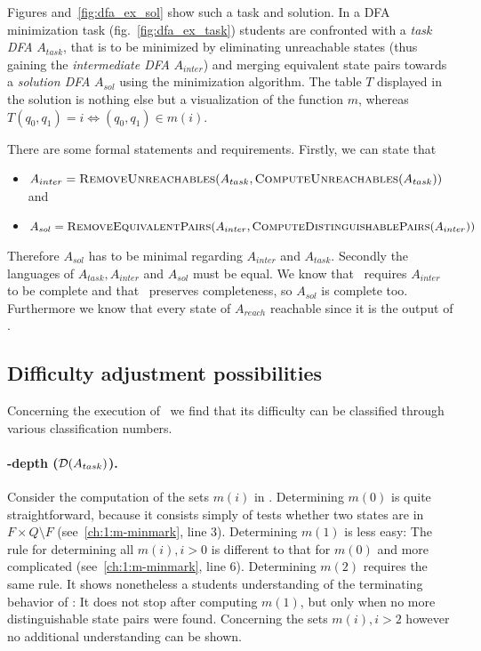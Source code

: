 \noindent Figures and~\ref{fig:dfa_ex_sol} show such a task and solution. In a DFA minimization task (fig.~\ref{fig:dfa_ex_task}) students are confronted with a \emph{task DFA} $A_{task}$, that is to be minimized by eliminating unreachable states (thus gaining the \emph{intermediate DFA} $A_{inter}$) and merging equivalent state pairs towards a \emph{solution DFA} $A_{sol}$ using the minimization algorithm. The table $T$ displayed in the solution is nothing else but a visualization of the function $m$, whereas $T(q_0, q_1) = i \Leftrightarrow (q_0, q_1) \in m(i)$. 

There are some formal statements and requirements. Firstly, we can state that
\begin{itemize}
	\item $A_{inter} = \textsc{RemoveUnreachables}(A_{task}, \textsc{ComputeUnreachables}(A_{task}))$ and
	\item $A_{sol} = \textsc{RemoveEquivalentPairs}(A_{inter}, \textsc{ComputeDistinguishablePairs}(A_{inter}))$
\end{itemize}
Therefore $A_{sol}$ has to be minimal regarding $A_{inter}$ and $A_{task}$. Secondly the languages of $A_{task}, A_{inter}$ and $A_{sol}$ must be equal. We know that \CompDist\ requires $A_{inter}$ to be complete and that \RemEq\ preserves completeness, so $A_{sol}$ is complete too. Furthermore we know that every state of $A_{reach}$ reachable since it is the output of \RemUnr.


\subsection{Difficulty adjustment possibilities}

Concerning the execution of \MinAlg\ we find that its difficulty can be classified through various classification numbers.

\paragraph*{\CompDist-depth ($\mathcal{D}(A_{task})$).}

Consider the computation of the sets $m(i)$ in \CompDist. Determining $m(0)$ is quite straightforward, because it consists simply of tests whether two states are in $F \times Q \setminus F$ (see~\ref{ch:1:m-minmark}, line 3). Determining $m(1)$ is less easy: The rule for determining all $m(i), i > 0$ is different to that for $m(0)$ and more complicated (see~\ref{ch:1:m-minmark}, line 6). Determining $m(2)$ requires the same rule. It shows nonetheless a students understanding of the terminating behavior of \CompDist: It does not stop after computing $m(1)$, but only when no more distinguishable state pairs were found. Concerning the sets $m(i), i > 2$ however no additional understanding can be shown.

